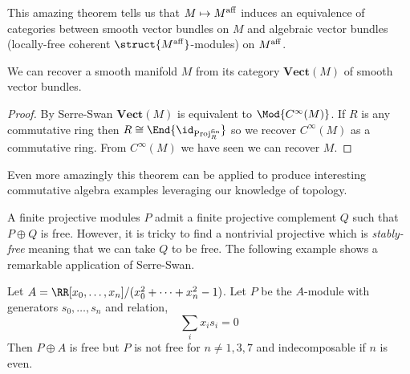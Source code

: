 \documentclass[12pt]{article}
\begin{document}
This amazing theorem tells us that $M \mapsto M^{\mathrm{aff}}$ induces an equivalence of categories between smooth vector bundles on $M$ and algebraic vector bundles (locally-free coherent $\struct{M^{\aff}}$-modules) on $M^{\mathrm{aff}}$.

\begin{cor}
We can recover a smooth manifold $M$ from its category $\mathbf{Vect}(M)$ of smooth vector bundles.
\end{cor}

\begin{proof}
By Serre-Swan $\mathbf{Vect}(M)$ is equivalent to $\Mod{C^{\infty}(M)}$. If $R$ is any commutative ring then $R \cong \End{\id_{\mathrm{Proj}_R^{\text{fin}}}}$ so we recover $C^{\infty}(M)$ as a commutative ring. From $C^{\infty}(M)$ we have seen we can recover $M$.
\end{proof}

Even more amazingly this theorem can be applied to produce interesting commutative algebra examples leveraging our knowledge of topology.

\begin{rmk}
A finite projective modules $P$ admit a finite projective complement $Q$ such that $P \oplus Q$ is free. However, it is tricky to find a nontrivial projective which is \textit{stably-free} meaning that we can take $Q$ to be free. The following example shows a remarkable application of Serre-Swan. 
\end{rmk}

\begin{cor}
Let $A = \RR[x_0, \dots, x_n] / (x_0^2 + \cdots + x_n^2 - 1)$. Let $P$ be the $A$-module with generators $s_0, \dots, s_n$ and relation,
\[ \sum_i x_i s_i = 0 \]
Then $P \oplus A$ is free but $P$ is not free for $n \neq 1,3,7$ and indecomposable if $n$ is even.
\end{cor}
\end{document}
